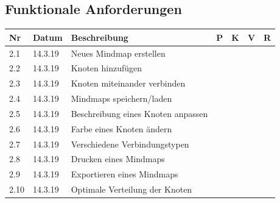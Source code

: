 \documentclass[a4paper,parskip]{scrartcl}
\begin{document}
\subsection{Funktionale Anforderungen}
\begin{table}[h]

\begin{tabular}{|l|l|l|l|l|l|l|}

\hline
Nr  & Datum   & Beschreibung                        & P & K & V & R \\ \hline
2.1 & 14.3.19 & Neues Mindmap erstellen             &   &   &   &   \\ \hline
2.2 & 14.3.19 & Knoten hinzufügen                   &   &   &   &   \\ \hline
2.3 & 14.3.19 & Knoten miteinander verbinden        &   &   &   &   \\ \hline
2.4 & 14.3.19 & Mindmaps speichern/laden            &   &   &   &   \\ \hline
2.5 & 14.3.19 & Beschreibung eines Knoten anpassen  &   &   &   &   \\ \hline
2.6 & 14.3.19 & Farbe eines Knoten ändern           &   &   &   &   \\ \hline
2.7 & 14.3.19 & Verschiedene Verbindungstypen       &   &   &   &   \\ \hline
2.8 & 14.3.19 & Drucken eines Mindmaps              &   &   &   &   \\ \hline
2.9 & 14.3.19 & Exportieren eines Mindmaps          &   &   &   &   \\ \hline
2.10 & 14.3.19 & Optimale Verteilung der Knoten      &   &   &   &   \\ \hline

\end{tabular}

\end{table}
\end{document}
